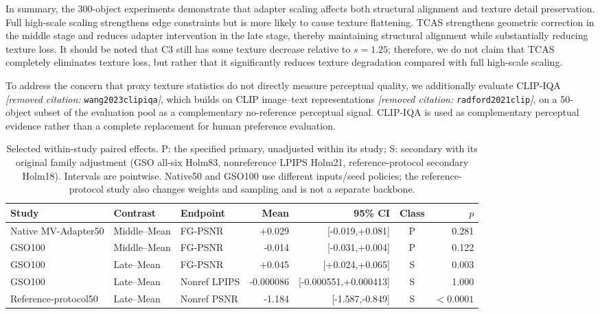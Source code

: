 \documentclass[times,twocolumn,final]{elsarticle}
\providecommand{\DIFdel}[1]{{\protect\color{red} \scriptsize #1}} %
\providecommand{\DIFaddbegin}{} %
\providecommand{\DIFaddend}{} %
\providecommand{\DIFdelbegin}{} %
\providecommand{\DIFdelend}{} %
\begin{document}
\DIFdelbegin \DIFdel{In summary, the 300-object experiments demonstrate that adapter scaling affects both structural alignment and texture detail preservation. Full high-scale scaling strengthens edge constraints but is more likely to cause texture flattening. TCAS strengthens geometric correction in the middle stage and reduces adapter intervention in the late stage, thereby maintaining structural alignment while substantially reducing texture loss. It should be noted that C3 still has some texture decrease relative to $s = 1.25$; therefore, we do not claim that TCAS completely eliminates texture loss, but rather that it significantly reduces texture degradation compared with full high-scale scaling. }%

\DIFdel{To address the concern that proxy texture statistics do not directly measure perceptual quality, we additionally evaluate CLIP-IQA \textit{[removed citation: }\texttt{wang2023clipiqa}\textit{]}, which builds on CLIP image--text representations \textit{[removed citation: }\texttt{radford2021clip}\textit{]}, on a 50-object subset of the evaluation pool as a complementary no-reference perceptual signal. CLIP-IQA is used as complementary perceptual evidence rather than a complete replacement for human preference evaluation.
}\DIFdelend \DIFaddbegin \begin{table}[t]\centering\scriptsize\setlength{\tabcolsep}{3pt}
\caption{Selected within-study paired effects. P: the specified primary, unadjusted within its study; S: secondary with its original family adjustment (GSO all-six Holm83, nonreference LPIPS Holm21, reference-protocol secondary Holm18). Intervals are pointwise. Native50 and GSO100 use different inputs/seed policies; the reference-protocol study also changes weights and sampling and is not a separate backbone.}
\label{tab:interface-effects}
\begin{tabular}{lllrrcr}
\toprule Study & Contrast & Endpoint & Mean & 95\% CI & Class & $p$ \\
\midrule
Native MV-Adapter50 & Middle--Mean & FG-PSNR & +0.029 & [-0.019,+0.081] & P & 0.281 \\
GSO100 & Middle--Mean & FG-PSNR & -0.014 & [-0.031,+0.004] & P & 0.122 \\
GSO100 & Late--Mean & FG-PSNR & +0.045 & [+0.024,+0.065] & S & 0.003 \\
GSO100 & Late--Mean & Nonref LPIPS & -0.000086 & [-0.000551,+0.000413] & S & 1.000 \\
Reference-protocol50 & Late--Mean & Nonref PSNR & -1.184 & [-1.587,-0.849] & S & $<0.0001$ \\

\bottomrule\end{tabular}\end{table}
\DIFaddend 
\end{document}
